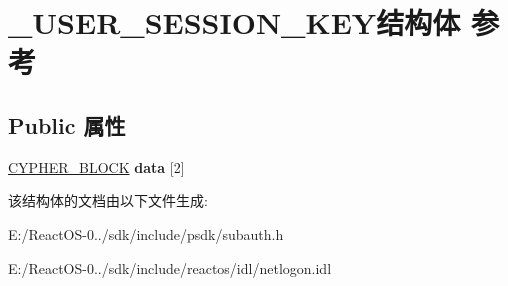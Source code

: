 \hypertarget{struct___u_s_e_r___s_e_s_s_i_o_n___k_e_y}{}\section{\+\_\+\+U\+S\+E\+R\+\_\+\+S\+E\+S\+S\+I\+O\+N\+\_\+\+K\+E\+Y结构体 参考}
\label{struct___u_s_e_r___s_e_s_s_i_o_n___k_e_y}
\subsection*{Public 属性}
\begin{DoxyCompactItemize}
\item 
\mbox{\label{struct___u_s_e_r___s_e_s_s_i_o_n___k_e_y_ab6faadc9bd5995655dbf4f187573818c}} 
\hyperlink{struct___c_y_p_h_e_r___b_l_o_c_k}{C\+Y\+P\+H\+E\+R\+\_\+\+B\+L\+O\+CK} {\bfseries data} \mbox{[}2\mbox{]}
\end{DoxyCompactItemize}


该结构体的文档由以下文件生成\+:\begin{DoxyCompactItemize}
\item 
E\+:/\+React\+O\+S-\/0../sdk/include/psdk/subauth.\+h\item 
E\+:/\+React\+O\+S-\/0../sdk/include/reactos/idl/netlogon.\+idl\end{DoxyCompactItemize}
